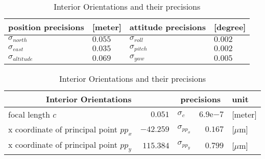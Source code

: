 \begin{table}%
	\centering
	\begin{tabular}{ll|ll}
		\toprule
		position precisions  &[meter]  & attitude precisions & [degree]\\
		\midrule
		$\sigma_{north}$     & $0.055$ & $\sigma_{roll}$  & $0.002$\\
		$\sigma_{east}$      & $0.035$ & $\sigma_{pitch}$ & $0.002$\\
		$\sigma_{altitude}$  & $0.069$ & $\sigma_{yaw}$   & $0.005$\\
		\bottomrule
	\end{tabular}
	\caption{Precisions of Exterior Orientations}
	\label{tab:EOprecision}
	\vspace{0.3cm}
	\centering
	\begin{tabular}{lr|lr|l}
		\toprule
		\multicolumn{2}{c|}{Interior Orientations}  & \multicolumn{2}{c|}{precisions} & unit\\
		\midrule
		focal length $c$                       &   $0.051$ & $\sigma_c$      & $6.9\mathrm{e}{-7}$ & [meter]\\
		x coordinate of principal point $pp_x$ & $-42.259$ & $\sigma_{pp_x}$ & $0.167$             &[$\mu$m]\\
		x coordinate of principal point $pp_y$ & $115.384$ & $\sigma_{pp_y}$ & $0.799$             &[$\mu$m]\\
		\bottomrule
	\end{tabular}
	\caption{Interior Orientations and their precisions}
	\label{tab:IOprecision}
\end{table}


